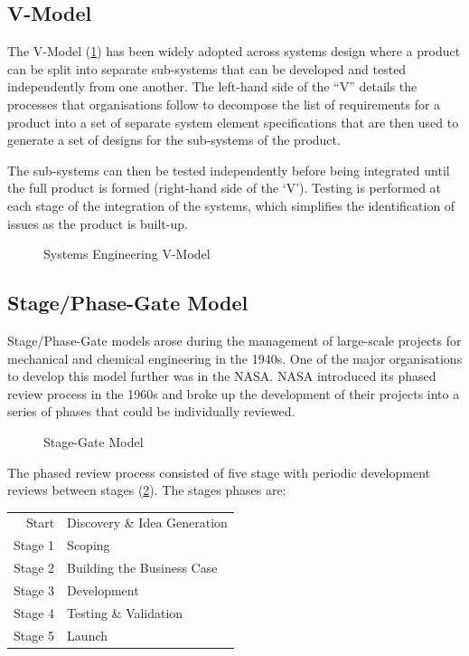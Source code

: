 \newpage{}

\subsection{V-Model}

The V-Model (\cref{fig-v-model}) has been widely adopted across systems design where a product can be split into separate sub-systems that can be developed and tested independently from one another. The left-hand side of the ``V'' details the processes that organisations follow to decompose the list of requirements for a product into a set of separate system element specifications that are then used to generate a set of designs for the sub-systems of the product.

The sub-systems can then be tested independently before being integrated until the full product is formed (right-hand side of the `V'). Testing is performed at each stage of the integration of the systems, which simplifies the identification of issues as the product is built-up.

\begin{figure}[h!]
  \centering
  \resizebox{0.8\textwidth}{!}{
    
  }
  \caption{Systems Engineering V-Model}\label{fig-v-model}
\end{figure}


\subsection{Stage/Phase-Gate Model}

Stage/Phase-Gate models arose during the management of large-scale projects for mechanical and chemical engineering in the 1940s. One of the major organisations to develop this model further was in the \acf{NASA}. \ac{NASA} introduced its phased review process in the 1960s and broke up the development of their projects into a series of phases that could be individually reviewed.

\begin{figure}
  \centering
  \small
  
  \caption{Stage-Gate Model}\label{fig-stage}
\end{figure}

The phased review process consisted of five stage with periodic development reviews between stages (\cref{fig-stage}). The stages phases are:

\begin{table}
  \begin{tabular}{r l}
    Start & Discovery \& Idea Generation \\
    Stage 1 & Scoping \\
    Stage 2 & Building the Business Case \\
    Stage 3 & Development \\
    Stage 4 & Testing \& Validation \\
    Stage 5 & Launch \\
  \end{tabular}
\end{table}


